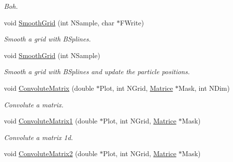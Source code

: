 \begin{DoxyCompactItemize}
\begin{DoxyCompactList}\small\item\em \-Boh. \end{DoxyCompactList}\item 
\hypertarget{classVarData_a3d0e967c8f2515c16170245de47ffcbe}{void \hyperlink{classVarData_a3d0e967c8f2515c16170245de47ffcbe}{\-Smooth\-Grid} (int \-N\-Sample, char $\ast$\-F\-Write)}\label{classVarData_a3d0e967c8f2515c16170245de47ffcbe}

\begin{DoxyCompactList}\small\item\em \-Smooth a grid with \-B\-Splines. \end{DoxyCompactList}\item 
void \hyperlink{classVarData_a5963ed99faa37dbc4de06d8ee376fd20}{\-Smooth\-Grid} (int \-N\-Sample)
\begin{DoxyCompactList}\small\item\em \-Smooth a grid with \-B\-Splines and update the particle positions. \end{DoxyCompactList}\item 
\hypertarget{classVarData_af94063719b4ada99c5cc0f493c3168dc}{void \hyperlink{classVarData_af94063719b4ada99c5cc0f493c3168dc}{\-Convolute\-Matrix} (double $\ast$\-Plot, int \-N\-Grid, \hyperlink{classMatrice}{\-Matrice} $\ast$\-Mask, int \-N\-Dim)}\label{classVarData_af94063719b4ada99c5cc0f493c3168dc}

\begin{DoxyCompactList}\small\item\em \-Convolute a matrix. \end{DoxyCompactList}\item 
\hypertarget{classVarData_aa71815f5a54d45211d2e36f338010741}{void \hyperlink{classVarData_aa71815f5a54d45211d2e36f338010741}{\-Convolute\-Matrix1} (double $\ast$\-Plot, int \-N\-Grid, \hyperlink{classMatrice}{\-Matrice} $\ast$\-Mask)}\label{classVarData_aa71815f5a54d45211d2e36f338010741}

\begin{DoxyCompactList}\small\item\em \-Convolute a matrix 1d. \end{DoxyCompactList}\item 
\hypertarget{classVarData_a66364ab1a4bcb0748e0548b1f15447af}{void \hyperlink{classVarData_a66364ab1a4bcb0748e0548b1f15447af}{\-Convolute\-Matrix2} (double $\ast$\-Plot, int \-N\-Grid, \hyperlink{classMatrice}{\-Matrice} $\ast$\-Mask)}\label{classVarData_a66364ab1a4bcb0748e0548b1f15447af}


\end{DoxyCompactItemize}
